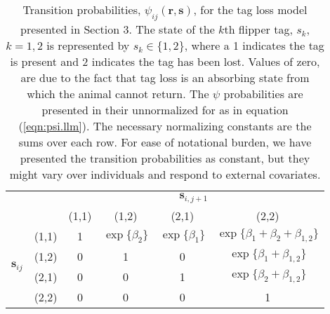 \documentclass[fleqn]{article}
\newcommand{\bs}{\ensuremath{\mathbf{s}}}
\newcommand{\br}{\ensuremath{\mathbf{r}}}
\begin{document}
\begin{table}[ht]
\centering
\parbox{\textwidth}{\caption{\label{tb:psi.example}  Transition probabilities, $\psi_{ij}(\br,\bs)$, for the tag loss model presented in Section 3. The state of the $k$th flipper tag, $s_k$, $k=1,2$ is represented by $s_k \in \{1,2\}$, where a 1 indicates the tag is present and 2 indicates the tag has been lost. Values of zero, are due to the fact that tag loss is an absorbing state from which the animal cannot return. The $\psi$ probabilities are presented in their unnormalized for as in equation (\ref{eqn:psi.llm}). The necessary normalizing constants are the sums over each row. For ease of notational burden, we have presented the transition probabilities as constant, but they might vary over individuals and respond to external covariates.}} \medskip

\begin{tabular}{cc|cccc|}
\cline{3-6}
 &  & \multicolumn{4}{c|}{$\bs_{i,j+1}$} \\
 &  & (1,1) & (1,2) & (2,1) & (2,2) \\ \hline
\multicolumn{1}{|c}{\multirow{4}{*}{$\bs_{ij}$}} & (1,1) & 1 & $\exp\{\beta_2\}$ & $\exp\{\beta_1\}$ & $\exp\{\beta_1+\beta_2+\beta_{1,2}\}$ \\
\multicolumn{1}{|c}{} & (1,2) & 0 & 1 & 0 & $\exp\{\beta_1+\beta_{1,2}\}$ \\
\multicolumn{1}{|c}{} & (2,1) & 0 & 0 & 1 & $\exp\{\beta_2+\beta_{1,2}\}$ \\
\multicolumn{1}{|c}{} & (2,2) & 0 & 0 & 0 & 1 \\ \hline
\end{tabular}
\end{table}


\clearpage
\end{document}
